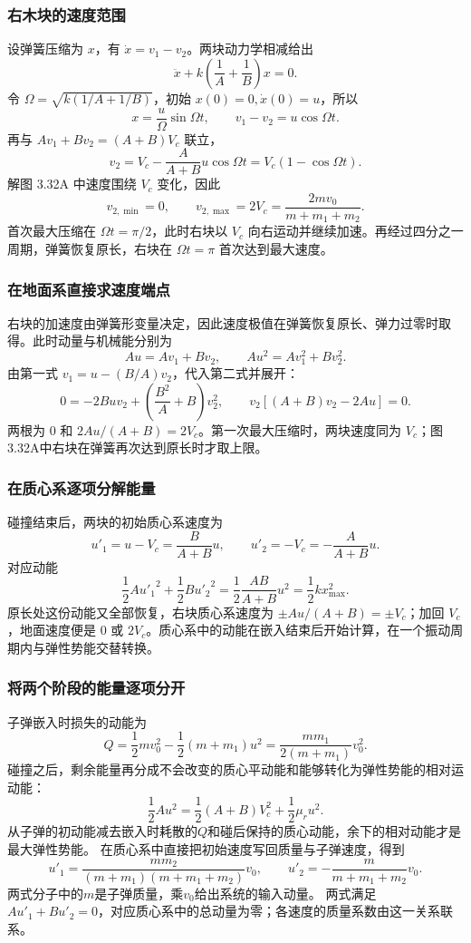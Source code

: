 \documentclass[UTF8,fontset=fandol,a4paper,11pt]{ctexart}
\begin{document}
\subsubsection*{右木块的速度范围}
设弹簧压缩为 $x$，有 $\dot x=v_1-v_2$。两块动力学相减给出
\[
\ddot x+k\left(\frac1A+\frac1B\right)x=0.
\]
令 $\Omega=\sqrt{k(1/A+1/B)}$，初始 $x(0)=0,\dot x(0)=u$，所以
\[
x=\frac u\Omega\sin\Omega t,\qquad
v_1-v_2=u\cos\Omega t.
\]
再与 $Av_1+Bv_2=(A+B)V_c$ 联立，
\[
v_2=V_c-\frac{A}{A+B}u\cos\Omega t
=V_c(1-\cos\Omega t).
\]
解图 3.32A 中速度围绕 $V_c$ 变化，因此
\[
\boxed{v_{2,\min}=0,\qquad
v_{2,\max}=2V_c=\frac{2mv_0}{m+m_1+m_2}}.
\]
首次最大压缩在 $\Omega t=\pi/2$，此时右块以 $V_c$ 向右运动并继续加速。再经过四分之一周期，弹簧恢复原长，右块在 $\Omega t=\pi$ 首次达到最大速度。

\subsubsection*{在地面系直接求速度端点}
右块的加速度由弹簧形变量决定，因此速度极值在弹簧恢复原长、弹力过零时取得。此时动量与机械能分别为
\[
Au=Av_1+Bv_2,\qquad Au^2=Av_1^2+Bv_2^2.
\]
由第一式 $v_1=u-(B/A)v_2$，代入第二式并展开：
\[
0=-2Buv_2+\left(\frac{B^2}{A}+B\right)v_2^2,
\qquad v_2[(A+B)v_2-2Au]=0.
\]
两根为 $0$ 和 $2Au/(A+B)=2V_c$。第一次最大压缩时，两块速度同为 $V_c$；图3.32A中右块在弹簧再次达到原长时才取上限。

\subsubsection*{在质心系逐项分解能量}
碰撞结束后，两块的初始质心系速度为
\[
u'_1=u-V_c=\frac{B}{A+B}u,\qquad
u'_2=-V_c=-\frac{A}{A+B}u.
\]
对应动能
\[
\frac12A{u'_1}^2+\frac12B{u'_2}^2
=\frac12\frac{AB}{A+B}u^2
=\frac12kx_{\max}^2.
\]
原长处这份动能又全部恢复，右块质心系速度为 $\pm Au/(A+B)=\pm V_c$；加回 $V_c$，地面速度便是 $0$ 或 $2V_c$。质心系中的动能在嵌入结束后开始计算，在一个振动周期内与弹性势能交替转换。
\subsubsection*{将两个阶段的能量逐项分开}
子弹嵌入时损失的动能为
\[
Q=\frac12mv_0^2-\frac12(m+m_1)u^2
=\frac{mm_1}{2(m+m_1)}v_0^2.
\]
碰撞之后，剩余能量再分成不会改变的质心平动能和能够转化为弹性势能的相对运动能：
\[
\frac12Au^2=\frac12(A+B)V_c^2+\frac12\mu_r u^2.
\]
从子弹的初动能减去嵌入时耗散的$Q$和碰后保持的质心动能，余下的相对动能才是最大弹性势能。
在质心系中直接把初始速度写回质量与子弹速度，得到
\[
u'_1=\frac{mm_2}{(m+m_1)(m+m_1+m_2)}v_0,
\qquad u'_2=-\frac{m}{m+m_1+m_2}v_0.
\]
两式分子中的$m$是子弹质量，乘$v_0$给出系统的输入动量。
两式满足$Au'_1+Bu'_2=0$，对应质心系中的总动量为零；各速度的质量系数由这一关系联系。
\end{document}
